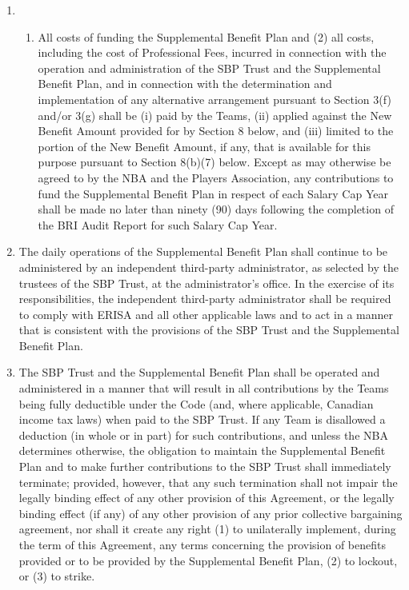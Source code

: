 \documentclass[
]{book}
\providecommand{\tightlist}{%
  \setlength{\itemsep}{0pt}\setlength{\parskip}{0pt}}
\begin{document}
\begin{enumerate}
\begin{enumerate}
  \end{enumerate}
\item
  \begin{enumerate}
  \def\labelenumii{(\arabic{enumii})}
  \tightlist
  \item
    All costs of funding the Supplemental Benefit Plan and (2) all costs, including the cost of Professional Fees, incurred in connection with the operation and administration of the SBP Trust and the Supplemental Benefit Plan, and in connection with the determination and implementation of any alternative arrangement pursuant to Section 3(f) and/or 3(g) shall be (i) paid by the Teams, (ii) applied against the New Benefit Amount provided for by Section 8 below, and (iii) limited to the portion of the New Benefit Amount, if any, that is available for this purpose pursuant to Section 8(b)(7) below. Except as may otherwise be agreed to by the NBA and the Players Association, any contributions to fund the Supplemental Benefit Plan in respect of each Salary Cap Year shall be made no later than ninety (90) days following the completion of the BRI Audit Report for such Salary Cap Year.
  \end{enumerate}
\item
  The daily operations of the Supplemental Benefit Plan shall continue to be administered by an independent third-party administrator, as selected by the trustees of the SBP Trust, at the administrator's office. In the exercise of its responsibilities, the independent third-party administrator shall be required to comply with ERISA and all other applicable laws and to act in a manner that is consistent with the provisions of the SBP Trust and the Supplemental Benefit Plan.
\item
  The SBP Trust and the Supplemental Benefit Plan shall be operated and administered in a manner that will result in all contributions by the Teams being fully deductible under the Code (and, where applicable, Canadian income tax laws) when paid to the SBP Trust. If any Team is disallowed a deduction (in whole or in part) for such contributions, and unless the NBA determines otherwise, the obligation to maintain the Supplemental Benefit Plan and to make further contributions to the SBP Trust shall immediately terminate; provided, however, that any such termination shall not impair the legally binding effect of any other provision of this Agreement, or the legally binding effect (if any) of any other provision of any prior collective bargaining agreement, nor shall it create any right (1) to unilaterally implement, during the term of this Agreement, any terms concerning the provision of benefits provided or to be provided by the Supplemental Benefit Plan, (2) to lockout, or (3) to strike.

\end{enumerate}
\end{document}
